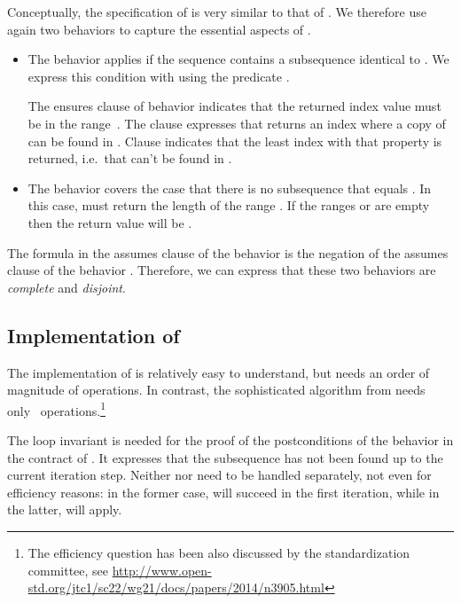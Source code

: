

Conceptually, the specification of \search is very similar to that of
.
We therefore use again two behaviors to capture the essential aspects of \search.

\begin{itemize}
\item
The behavior  applies if the sequence  
contains a subsequence identical to . 
We express this condition with  using the predicate 
.

The ensures clause  of behavior  
indicates that the returned index value must be in the range~\inl{[0..n-p]}.
The clause  expresses that
\search returns an index where a copy of  can be found in .
Clause 
indicates that the least index with that property is returned,
i.e.\ that  can't be found in .

\item
The behavior  covers the case that there is no
subsequence  that equals
. In this case, \search must return the length  of the
range .
%
If the ranges  or  are empty
then the return value will be . 
\end{itemize}

The formula in the assumes clause of the behavior
 is the negation of the assumes clause of the 
behavior .
Therefore, we can express that these two behaviors are
\emph{complete} and \emph{disjoint}.

\clearpage

\subsection{Implementation of \search}

The implementation of  is relatively easy to understand, but
needs an order of magnitude of  operations.
In contrast, the sophisticated algorithm from
\cite{Knuth.Morris.Pratt.1977}
needs only~ operations.\footnote{
  The efficiency question has been also discussed by the \cxx standardization committee, 
  see \url{http://www.open-std.org/jtc1/sc22/wg21/docs/papers/2014/n3905.html}
}

The loop invariant  is needed for the proof of the
postconditions of the behavior  in the contract of .
It expresses that the subsequence  has not been found up to the current iteration step.
%
Neither  nor  need to be handled separately, not
even for efficiency reasons:
in the former case,  will succeed in the first iteration,
while in the latter,  will apply.



\clearpage


